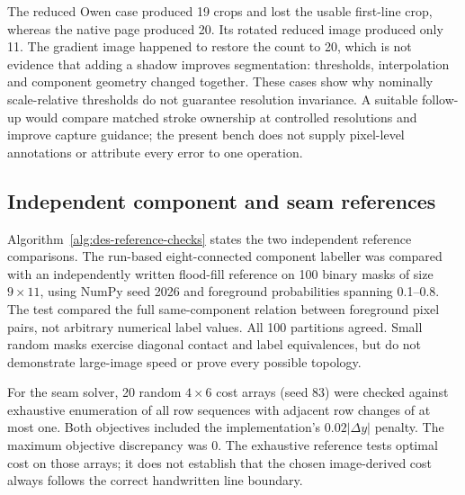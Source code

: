 The reduced Owen case produced 19 crops and lost the usable first-line crop, whereas the native page produced 20. Its rotated reduced image produced only 11. The gradient image happened to restore the count to 20, which is not evidence that adding a shadow improves segmentation: thresholds, interpolation and component geometry changed together. These cases show why nominally scale-relative thresholds do not guarantee resolution invariance. A suitable follow-up would compare matched stroke ownership at controlled resolutions and improve capture guidance; the present bench does not supply pixel-level annotations or attribute every error to one operation.~\cite[subsystem manifests]{brauneevidence2026}


\subsection{Independent component and seam references}
Algorithm~\ref{alg:des-reference-checks} states the two independent reference comparisons.
The run-based eight-connected component labeller was compared with an independently written flood-fill reference on 100 binary masks of size $9\times11$, using NumPy seed 2026 and foreground probabilities spanning 0.1--0.8. The test compared the full same-component relation between foreground pixel pairs, not arbitrary numerical label values. All 100 partitions agreed. Small random masks exercise diagonal contact and label equivalences, but do not demonstrate large-image speed or prove every possible topology.~\cite[subsystem manifests]{brauneevidence2026}


For the seam solver, 20 random $4\times6$ cost arrays (seed 83) were checked against exhaustive enumeration of all row sequences with adjacent row changes of at most one. Both objectives included the implementation's $0.02|\Delta y|$ penalty. The maximum objective discrepancy was $0$. The exhaustive reference tests optimal cost on those arrays; it does not establish that the chosen image-derived cost always follows the correct handwritten line boundary.~\cite[project records; implementation]{brauneevidence2026,braunepipeline2026}


